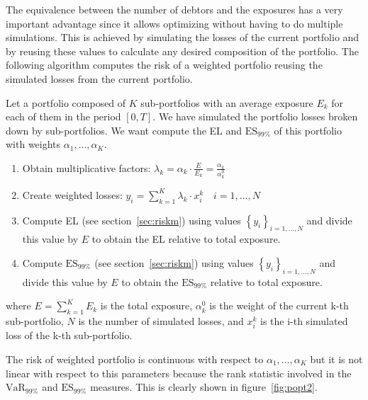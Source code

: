 \documentclass[11pt,fleqn]{book} %
\begin{document}
The equivalence between the number of debtors and the exposures has a very 
important advantage since it allows optimizing without having to do multiple 
simulations. This is achieved by simulating the losses of the current portfolio
and by reusing these values to calculate any desired composition of the 
portfolio. The following algorithm computes the risk of a weighted portfolio 
reusing the simulated losses from the current portfolio.

\begin{algorithm}
	\label{alg:rwp}
	Let a portfolio composed of $K$ sub-portfolios with an average exposure $E_k$ 
	for each of them in the period $[0, T]$. We have simulated the portfolio 
	losses broken down by sub-portfolios. We want compute the EL and 
	$\text{ES}_{99\%}$ of this portfolio with weights $\alpha_1,\dots,\alpha_K$.
	\begin{enumerate}
		\item Obtain multiplicative factors: 
		$\lambda_k = \alpha_k \cdot \frac{E}{E_k} = \frac{\alpha_k}{\alpha_k^0}$
		\item Create weighted losses: $y_i = \displaystyle \sum_{k=1}^K \lambda_k \cdot x_i^k \quad i=1,\dots,N$
		\item Compute EL (see section~\ref{sec:riskm}) using values $\left\{y_i\right\}_{i=1,\dots,N}$ 
		and divide this value by $E$ to obtain the EL relative to total exposure.
		\item Compute $\text{ES}_{99\%}$ (see section~\ref{sec:riskm}) using values 
		$\left\{y_i\right\}_{i=1,\dots,N}$ and divide this value by $E$ to obtain the 
		$\text{ES}_{99\%}$ relative to total exposure.
	\end{enumerate}
	where $E = \sum_{k=1}^K E_k$ is the total exposure, $\alpha_k^0$ is the weight
	of the current k-th sub-portfolio, $N$ is the number of simulated losses, and
	$x_i^k$ is the i-th simulated loss of the k-th sub-portfolio.
\end{algorithm}

The risk of weighted portfolio is continuous with respect to $\alpha_1,\dots,\alpha_K$
but it is not linear with respect to this parameters because the rank statistic 
involved in the $\text{VaR}_{99\%}$ and $\text{ES}_{99\%}$ measures. 
This is clearly shown in figure~\ref{fig:popt2}.
\end{document}
